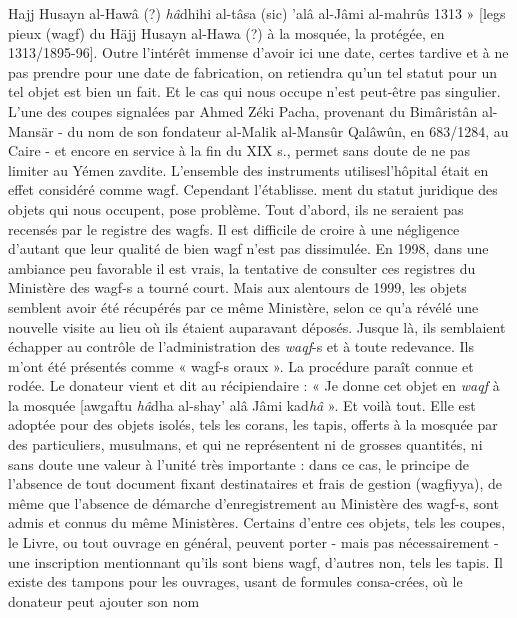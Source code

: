Hajj Husayn al-Hawâ (?) \textit{hâ}dhihi al-tâsa (sic) 'alâ al-Jâmi al-mahrûs
1313 » [legs pieux (wagf) du Häjj Husayn al-Hawa (?) à la mosquée, la protégée, en 1313/1895-96]. Outre l'intérêt immense d'avoir ici une date, certes tardive et à ne pas prendre pour une date de fabrication, on retiendra qu'un tel statut pour un tel objet est bien un fait. Et le cas qui nous occupe n'est peut-être pas singulier. L'une des coupes signalées par
Ahmed Zéki Pacha, provenant du Bimâristân al-Mansär - du nom de son
fondateur al-Malik al-Mansûr Qalâwûn, en 683/1284, au Caire - et encore en service à la fin du XIX s., permet sans doute de ne pas limiter
au Yémen zavdite. L'ensemble des instruments utilisesl'hôpital était en effet considéré comme wagf. Cependant l'établisse. ment du statut juridique des objets qui nous occupent, pose problème.
Tout d'abord, ils ne seraient pas recensés par le registre des wagfs. Il est difficile de croire à une négligence d'autant que leur qualité de bien wagf n'est pas dissimulée. En 1998, dans une ambiance peu favorable il est vrais, la tentative de consulter ces registres du Ministère des wagf-s a tourné court. Mais aux alentours de 1999, les objets semblent avoir été récupérés par ce même Ministère, selon ce qu'a révélé une nouvelle visite au lieu où ils étaient auparavant déposés. Jusque là, ils semblaient échapper au contrôle de l'administration des \textit{waqf}-s et à toute redevance.
Ils m'ont été présentés comme « wagf-s oraux ». La procédure paraît connue et rodée. Le donateur vient et dit au récipiendaire : « Je donne cet
objet en \textit{waqf} à la mosquée [awgaftu \textit{hâ}dha al-shay' alâ Jâmi kad\textit{hâ} ».
Et voilà tout. Elle est adoptée pour des objets isolés, tels les corans, les tapis, offerts à la mosquée par des particuliers, musulmans, et qui ne représentent ni de grosses quantités, ni sans doute une valeur à l'unité très importante : dans ce cas, le principe de l'absence de tout document fixant destinataires et frais de gestion (wagfiyya), de même que l'absence de démarche d'enregistrement au Ministère des wagf-s, sont admis et connus du même Ministères. Certains d'entre ces objets, tels les coupes, le Livre, ou tout ouvrage en général, peuvent porter - mais pas nécessairement - une inscription mentionnant qu'ils sont biens wagf, d'autres non, tels les tapis. Il existe des tampons pour les ouvrages, usant de formules consa-crées, où le donateur peut ajouter son nom%
